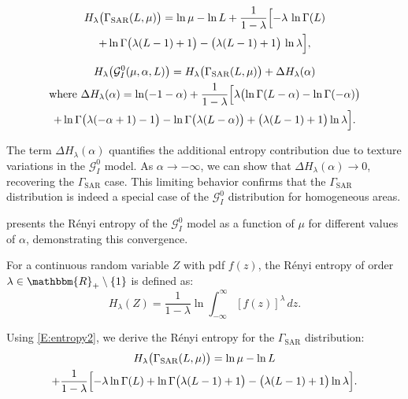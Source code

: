 \documentclass[11pt,]{article}
\begin{document}
\begin{multline}
\label{eq-HGammaSAR}
H_\lambda\bigl(\Gamma_{\text{SAR}}(L, \mu)\bigr)
= 
\ln \mu - \ln L + \frac{1}{1-\lambda}
\Bigl[
  -\lambda\,\ln\Gamma(L)  \\ + \ln\Gamma\bigl(\lambda(L-1)+1\bigr)  - \bigl(\lambda(L-1)+1\bigr)\,\ln\lambda
\Bigr],
\end{multline}

\begin{multline}
\label{eq-HGI0}
H_\lambda\bigl(\mathcal{G}^0_I(\mu, \alpha, L)\bigr) = H_\lambda\bigl(\Gamma_{\text{SAR}}(L, \mu)\bigr) + \Delta H_\lambda(\alpha) \\
\text{where } \Delta H_\lambda(\alpha) = \ln(-1 - \alpha) + \frac{1}{1 - \lambda}
\Bigl[
   \lambda\bigl(
      \ln\Gamma(L - \alpha)
      -\ln\Gamma(-\alpha)
   \bigr) \\
   +\ln\Gamma\bigl(\lambda(-\alpha + 1) - 1\bigr)
   -\ln\Gamma\bigl(\lambda(L - \alpha)\bigr)
   +\bigl(\lambda(L-1)+1\bigr)\ln\lambda
\Bigr].
\end{multline}

The term \(\Delta H_\lambda(\alpha)\) quantifies the additional entropy
contribution due to texture variations in the \(\mathcal{G}^0_I\) model.
As \(\alpha \to -\infty\), we can show that
\(\Delta H_\lambda(\alpha) \to 0\), recovering the
\(\Gamma_{\mathrm{SAR}}\) case. This limiting behavior confirms that the
\(\Gamma_{\mathrm{SAR}}\) distribution is indeed a special case of the
\(\mathcal{G}^0_I\) distribution for homogeneous areas.

\citet{fig-plot} presents the Rényi entropy of the \(\mathcal{G}^0_I\)
model as a function of \(\mu\) for different values of \(\alpha\),
demonstrating this convergence.

For a continuous random variable \(Z\) with pdf \(f(z)\), the Rényi
entropy of order \(\lambda \in \mathbbm{R}_+ \setminus \{1\}\) is
defined as:\\
\begin{equation}  
\label{E:entropy2}  
H_\lambda(Z) = \frac{1}{1 - \lambda} \ln \int_{-\infty}^{\infty} [f(z)]^\lambda \, dz.  
\end{equation}

Using \eqref{E:entropy2}, we derive the Rényi entropy for the
\(\Gamma_{\text{SAR}}\) distribution:\\
\begin{multline}  
\label{eq-HGammaSAR}  
H_\lambda\bigl(\Gamma_{\text{SAR}}(L, \mu)\bigr) = \ln\mu - \ln L \\  
+ \frac{1}{1-\lambda} \Bigl[ -\lambda\ln\Gamma(L) + \ln\Gamma\bigl(\lambda(L-1)+1\bigr) - \bigl(\lambda(L-1)+1\bigr)\ln\lambda \Bigr].  
\end{multline}
\end{document}
